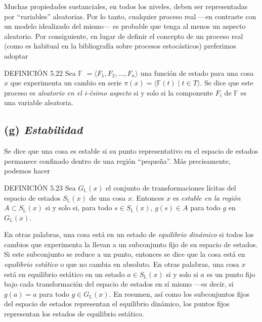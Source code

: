 \begin{justifying}
    Muchas propiedades sustanciales, en todos los niveles, deben ser representadas 
    por ``variables'' aleatorias. Por lo tanto, cualquier proceso real ---en 
    contraste con un modelo idealizado del mismo--- es probable que tenga al menos 
    un aspecto aleatorio. Por consiguiente, en lugar de definir el concepto de 
    un proceso real (como es habitual en la bibliografía sobre procesos 
    estocásticos) preferimos adoptar

    \newpage

    \noindent DEFINICIÓN 5.22 Sea $\mathbb{F}$ $ = \langle F_1, F_2, \dots, F_n \rangle$ 
    una función de estado para una cosa $x$ que experimenta un cambio en serie 
    $\pi(x) = \langle \mathbb F(t) \mid t \in T \rangle$. Se dice que este proceso es 
    \textit{aleatorio en el i-ésimo aspecto} si y solo si la componente $F_i$ 
    de $\mathbb{F}$ es una variable aleatoria.

    \subsection*{(g)\textit{ Estabilidad}}
    \noindent Se dice que una cosa es estable si su punto representativo en el espacio de 
    estados permanece confinado dentro de una región ``pequeña''. Más 
    precisamente, podemos hacer

    \bigskip

    \noindent DEFINICIÓN 5.23 Sea $G_{\mathbb{L}}(x)$ el conjunto de transformaciones 
    lícitas del espacio de estados $S_{\mathbb{L}}(x)$ de una cosa $x$. Entonces $x$ es 
    \textit{estable en la región} $A \subset S_{\mathbb{L}}(x)$ si y solo si, para todo 
    $s \in S_{\mathbb{L}}(x)$, $g(s) \in A$ para todo $g$ en $G_{\mathbb{L}}(x)$.

    En otras palabras, una cosa está en un estado de \textit{equilibrio dinámico} 
    si todos los cambios que experimenta la llevan a un subconjunto fijo de su 
    espacio de estados. Si este subconjunto se reduce a un punto, entonces se 
    dice que la cosa está en \textit{equilibrio estático} o que no cambia en 
    absoluto. En otras palabras, una cosa $x$ está en equilibrio estático en un 
    estado $a \in S_{\mathbb{L}}(x)$ si y solo si $a$ es un punto fijo bajo cada 
    transformación del espacio de estados en sí mismo ---es decir, si $g(a) = a$ 
    para todo $g \in G_{\mathbb{L}}(x)$. En resumen, así como los subconjuntos fijos 
    del espacio de estados representan el equilibrio dinámico, los puntos fijos 
    representan los estados de equilibrio estático.


\end{justifying}
